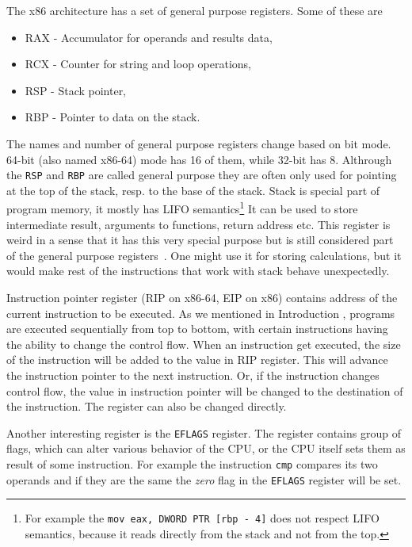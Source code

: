 The x86 architecture has a set of general purpose registers.
Some of these are
\begin{itemize}
    \item RAX - Accumulator for operands and results data,
    \item RCX - Counter for string and loop operations,
    \item RSP - Stack pointer,
    \item RBP - Pointer to data on the stack.
\end{itemize}
The names and number of general purpose registers change based on bit mode. 64-bit (also named x86-64) mode has 16 of them, while 32-bit has 8.
Althrough the \texttt{RSP} and \texttt{RBP} are called general purpose they are often only used for pointing at the top of the stack,
resp. to the base of the stack. Stack is special part of program memory, it mostly has LIFO
semantics\footnote{For example the \texttt{mov eax, DWORD PTR [rbp - 4]} does not respect
LIFO semantics, because it reads directly from the stack and not from the top.}
It can be used to store intermediate result, arguments to functions, return address etc.
This register is weird in a sense that it has this very special purpose but is still considered part of
the general purpose registers~\cite{intel-manual}. One might use it for storing calculations, but it would make
rest of the instructions that work with stack behave unexpectedly.

Instruction pointer register (RIP on x86-64, EIP on x86) contains address of the current instruction to be executed. As we mentioned
in Introduction , programs are executed sequentially from top to bottom, with certain instructions
having the ability to change the control flow. When an instruction get executed, the size of the instruction
will be added to the value in RIP register. This will advance the instruction pointer to the next instruction.
Or, if the instruction changes control flow, the value in instruction pointer will be changed to the destination
of the instruction. The register can also be changed directly.

Another interesting register is the \texttt{EFLAGS} register. The register contains group
of flags, which can alter various behavior of the CPU, or the CPU itself sets them
as result of some instruction. For example the instruction \texttt{cmp} compares its two operands
and if they are the same the \textit{zero} flag in the \texttt{EFLAGS} register will be set.

